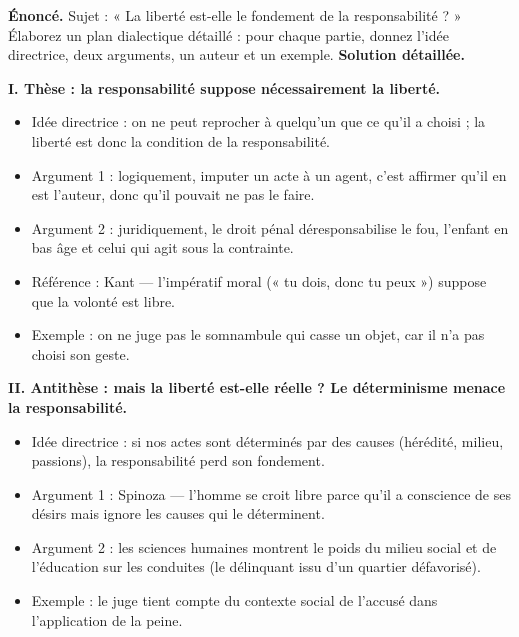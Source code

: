 \documentclass[11pt]{article}
\begin{document}
\begin{exoresolu}
\textbf{Énoncé.} Sujet : « La liberté est-elle le fondement de la responsabilité ? » Élaborez un plan dialectique détaillé : pour chaque partie, donnez l'idée directrice, deux arguments, un auteur et un exemple.
\tcblower
\textbf{Solution détaillée.}

\textbf{I. Thèse : la responsabilité suppose nécessairement la liberté.}
\begin{itemize}
\item Idée directrice : on ne peut reprocher à quelqu'un que ce qu'il a choisi ; la liberté est donc la condition de la responsabilité.
\item Argument 1 : logiquement, imputer un acte à un agent, c'est affirmer qu'il en est l'auteur, donc qu'il pouvait ne pas le faire.
\item Argument 2 : juridiquement, le droit pénal déresponsabilise le fou, l'enfant en bas âge et celui qui agit sous la contrainte.
\item Référence : Kant — l'impératif moral (« tu dois, donc tu peux ») suppose que la volonté est libre.
\item Exemple : on ne juge pas le somnambule qui casse un objet, car il n'a pas choisi son geste.
\end{itemize}

\textbf{II. Antithèse : mais la liberté est-elle réelle ? Le déterminisme menace la responsabilité.}
\begin{itemize}
\item Idée directrice : si nos actes sont déterminés par des causes (hérédité, milieu, passions), la responsabilité perd son fondement.
\item Argument 1 : Spinoza — l'homme se croit libre parce qu'il a conscience de ses désirs mais ignore les causes qui le déterminent.
\item Argument 2 : les sciences humaines montrent le poids du milieu social et de l'éducation sur les conduites (le délinquant issu d'un quartier défavorisé).
\item Exemple : le juge tient compte du contexte social de l'accusé dans l'application de la peine.
\end{itemize}


\end{exoresolu}
\end{document}
